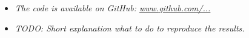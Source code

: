 \begin{itemize}
    \item \textit{The code is available on GitHub: \url{www.github.com/...}}
    \item \textit{TODO: Short explanation what to do to reproduce the results.}
\end{itemize}







